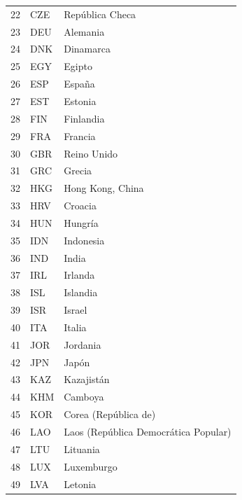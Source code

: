 \begin{longtable}{lll}
	22 & CZE    & República Checa                      \\
	23 & DEU    & Alemania                             \\
	24 & DNK    & Dinamarca                            \\
	25 & EGY    & Egipto                               \\
	26 & ESP    & España                               \\
	27 & EST    & Estonia                              \\
	28 & FIN    & Finlandia                            \\
	29 & FRA    & Francia                              \\
	30 & GBR    & Reino Unido                          \\
	31 & GRC    & Grecia                               \\
	32 & HKG    & Hong Kong, China                     \\
	33 & HRV    & Croacia                              \\
	34 & HUN    & Hungría                              \\
	35 & IDN    & Indonesia                            \\
	36 & IND    & India                                \\
	37 & IRL    & Irlanda                              \\
	38 & ISL    & Islandia                             \\
	39 & ISR    & Israel                               \\
	40 & ITA    & Italia                               \\
	41 & JOR    & Jordania                             \\
	42 & JPN    & Japón                                \\
	43 & KAZ    & Kazajistán                           \\
	44 & KHM    & Camboya                              \\
	45 & KOR    & Corea (República de)                 \\
	46 & LAO    & Laos (República Democrática Popular) \\
	47 & LTU    & Lituania                             \\
	48 & LUX    & Luxemburgo                           \\
	49 & LVA    & Letonia                              \\

\end{longtable}
